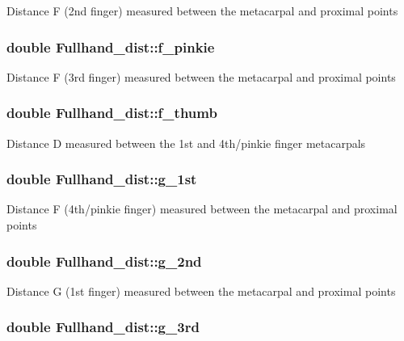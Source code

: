 \label{classFullhand__dist_aa2e0806e52c7b02657dfc7a68e2e9d0d}
Distance F (2nd finger) measured between the metacarpal and proximal points \hypertarget{classFullhand__dist_a9c3da861db4a277b0a149efc4f53ca67}{
\subsubsection[{f\_\-pinkie}]{\setlength{\rightskip}{0pt plus 5cm}double {\bf Fullhand\_\-dist::f\_\-pinkie}}}
\label{classFullhand__dist_a9c3da861db4a277b0a149efc4f53ca67}
Distance F (3rd finger) measured between the metacarpal and proximal points \hypertarget{classFullhand__dist_af5a94f725ddf9eed54e22f6ba8262d0c}{
\subsubsection[{f\_\-thumb}]{\setlength{\rightskip}{0pt plus 5cm}double {\bf Fullhand\_\-dist::f\_\-thumb}}}
\label{classFullhand__dist_af5a94f725ddf9eed54e22f6ba8262d0c}
Distance D measured between the 1st and 4th/pinkie finger metacarpals \hypertarget{classFullhand__dist_a23aafeae187e2d3f23825d6534b9f9c1}{
\subsubsection[{g\_\-1st}]{\setlength{\rightskip}{0pt plus 5cm}double {\bf Fullhand\_\-dist::g\_\-1st}}}
\label{classFullhand__dist_a23aafeae187e2d3f23825d6534b9f9c1}
Distance F (4th/pinkie finger) measured between the metacarpal and proximal points \hypertarget{classFullhand__dist_a784d55f542c3a25668577ddddcefd41e}{
\subsubsection[{g\_\-2nd}]{\setlength{\rightskip}{0pt plus 5cm}double {\bf Fullhand\_\-dist::g\_\-2nd}}}
\label{classFullhand__dist_a784d55f542c3a25668577ddddcefd41e}
Distance G (1st finger) measured between the metacarpal and proximal points \hypertarget{classFullhand__dist_af639475219dd57fb310655b1394b7a70}{
\subsubsection[{g\_\-3rd}]{\setlength{\rightskip}{0pt plus 5cm}double {\bf Fullhand\_\-dist::g\_\-3rd}}}
